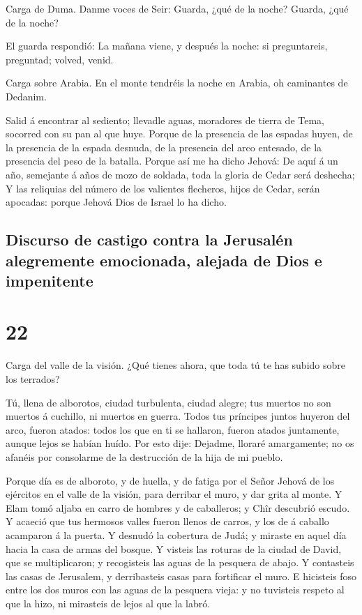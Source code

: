  Carga de Duma. Danme voces de Seir: Guarda, ¿qué de la
noche? Guarda, ¿qué de la noche?

 El guarda respondió: La mañana viene, y después la noche:
si preguntareis, preguntad; volved, venid.

 Carga sobre Arabia. En el monte tendréis la noche en
Arabia, oh caminantes de Dedanim.

 Salid á encontrar al sediento; llevadle aguas, moradores
de tierra de Tema, socorred con su pan al que huye.  Porque
de la presencia de las espadas huyen, de la presencia de la espada
desnuda, de la presencia del arco entesado, de la presencia del peso de
la batalla.  Porque así me ha dicho Jehová: De aquí á un
año, semejante á años de mozo de soldada, toda la gloria de Cedar será
deshecha;  Y las reliquias del número de los valientes
flecheros, hijos de Cedar, serán apocadas: porque Jehová Dios de Israel
lo ha dicho.

\hypertarget{discurso-de-castigo-contra-la-jerusaluxe9n-alegremente-emocionada-alejada-de-dios-e-impenitente}{%
\subsection{Discurso de castigo contra la Jerusalén alegremente
emocionada, alejada de Dios e
impenitente}\label{discurso-de-castigo-contra-la-jerusaluxe9n-alegremente-emocionada-alejada-de-dios-e-impenitente}}

\hypertarget{section-21}{%
\section{22}\label{section-21}}

 Carga del valle de la visión. ¿Qué tienes ahora, que toda
tú te has subido sobre los terrados?

 Tú, llena de alborotos, ciudad turbulenta, ciudad alegre;
tus muertos no son muertos á cuchillo, ni muertos en guerra.
 Todos tus príncipes juntos huyeron del arco, fueron atados:
todos los que en ti se hallaron, fueron atados juntamente, aunque lejos
se habían huído.  Por esto dije: Dejadme, lloraré
amargamente; no os afanéis por consolarme de la destrucción de la hija
de mi pueblo.

 Porque día es de alboroto, y de huella, y de fatiga por el
Señor Jehová de los ejércitos en el valle de la visión, para derribar el
muro, y dar grita al monte.  Y Elam tomó aljaba en carro de
hombres y de caballeros; y Chîr descubrió escudo.  Y acaeció
que tus hermosos valles fueron llenos de carros, y los de á caballo
acamparon á la puerta.  Y desnudó la cobertura de Judá; y
miraste en aquel día hacia la casa de armas del bosque.  Y
visteis las roturas de la ciudad de David, que se multiplicaron; y
recogisteis las aguas de la pesquera de abajo.  Y
contasteis las casas de Jerusalem, y derribasteis casas para fortificar
el muro.  E hicisteis foso entre los dos muros con las
aguas de la pesquera vieja: y no tuvisteis respeto al que la hizo, ni
mirasteis de lejos al que la labró.

